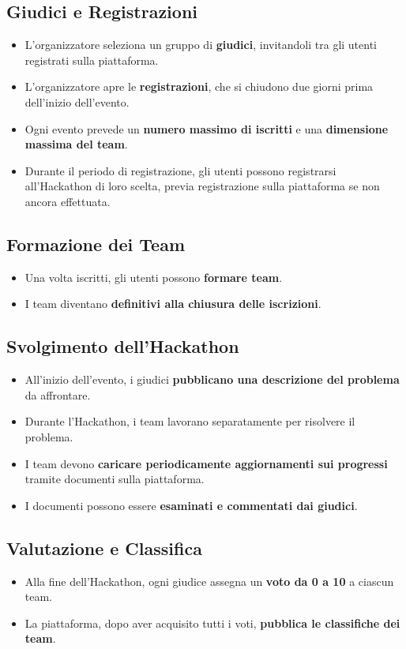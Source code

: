 \documentclass[a4paper, 10pt]{article}
\begin{document}
	\subsection*{Giudici e Registrazioni}
	\begin{itemize}
		\item L'organizzatore seleziona un gruppo di \textbf{giudici}, invitandoli tra gli utenti registrati sulla piattaforma.
		\item L'organizzatore apre le \textbf{registrazioni}, che si chiudono due giorni prima dell'inizio dell'evento.
		\item Ogni evento prevede un \textbf{numero massimo di iscritti} e una \textbf{dimensione massima del team}.
		\item Durante il periodo di registrazione, gli utenti possono registrarsi all'Hackathon di loro scelta, previa registrazione sulla piattaforma se non ancora effettuata.
	\end{itemize}
	\subsection*{Formazione dei Team}
	\begin{itemize}
		\item Una volta iscritti, gli utenti possono \textbf{formare team}.
		\item I team diventano \textbf{definitivi alla chiusura delle iscrizioni}.
	\end{itemize}
	\subsection*{Svolgimento dell'Hackathon}
	\begin{itemize}
		\item All'inizio dell'evento, i giudici \textbf{pubblicano una descrizione del problema} da affrontare.
		\item Durante l’Hackathon, i team lavorano separatamente per risolvere il problema.
		\item I team devono \textbf{caricare periodicamente aggiornamenti sui progressi} tramite documenti sulla piattaforma.
		\item I documenti possono essere \textbf{esaminati e commentati dai giudici}.
	\end{itemize}
	\subsection*{Valutazione e Classifica}
	\begin{itemize}
		\item Alla fine dell'Hackathon, ogni giudice assegna un \textbf{voto da 0 a 10} a ciascun team.
		\item La piattaforma, dopo aver acquisito tutti i voti, \textbf{pubblica le classifiche dei team}.
	\end{itemize}
\end{document}
